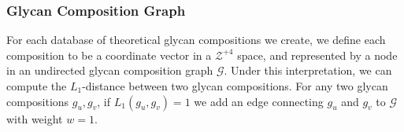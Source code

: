     \subsubsection{Glycan Composition Graph}
        For each database of theoretical glycan compositions we create, we
        define each composition to be a coordinate vector in a $\mathcal{Z}^{+4}$
        space, and represented by a node in an undirected glycan composition
        graph $\mathcal{G}$. Under this interpretation, we can compute the
        $L_1$-distance between two glycan compositions. For any two glycan
        compositions $g_u, g_v$, if $L_1(g_u, g_v) = 1$ we add an edge
        connecting $g_u$ and $g_v$ to $\mathcal{G}$ with weight $w = 1$.
